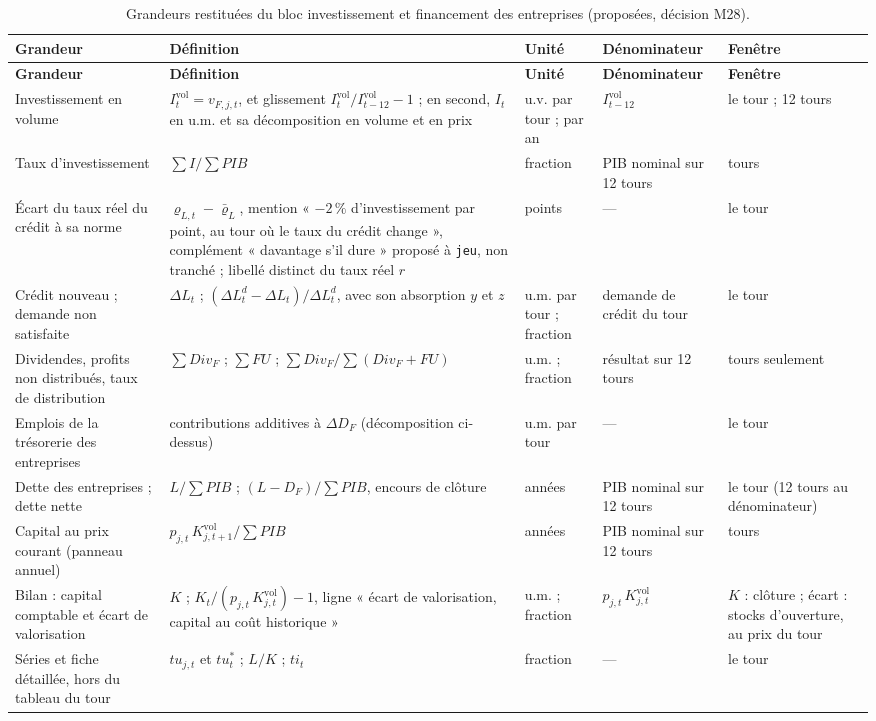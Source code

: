 \documentclass[11pt,a4paper]{article}
\begin{document}
\begin{center}\small
\setlength{\tabcolsep}{4pt}
\begin{longtable}{>{\raggedright\arraybackslash}p{2.5cm}>{\raggedright\arraybackslash}p{5.3cm}>{\raggedright\arraybackslash}p{1.7cm}>{\raggedright\arraybackslash}p{2.6cm}>{\raggedright\arraybackslash}p{2.3cm}}
\caption{Grandeurs restituées du bloc investissement et financement des entreprises (proposées, décision M28).}\label{tab:investissement-restitution}\\
\toprule
\textbf{Grandeur} & \textbf{Définition} & \textbf{Unité} & \textbf{Dénominateur} & \textbf{Fenêtre}\\
\midrule
\endfirsthead
\toprule
\textbf{Grandeur} & \textbf{Définition} & \textbf{Unité} & \textbf{Dénominateur} & \textbf{Fenêtre}\\
\midrule
\endhead
Investissement en volume & $I^{\mathrm{vol}}_t = v_{F,j,t}$, et glissement $I^{\mathrm{vol}}_t/I^{\mathrm{vol}}_{t-12} - 1$ ; en second, $I_t$ en u.m. et sa décomposition en volume et en prix & u.v. par tour ; par an & $I^{\mathrm{vol}}_{t-12}$ & le tour ; 12 tours\\
Taux d'investissement & $\sum I/\sum \mathit{PIB}$ & fraction & PIB nominal sur 12 tours & 12 tours\\
Écart du taux réel du crédit à sa norme & $\varrho_{L,t} - \bar\varrho_L$, mention « $-2\,\%$ d'investissement par point, au tour où le taux du crédit change », complément « davantage s'il dure » proposé à \texttt{jeu}, non tranché ; libellé distinct du taux réel $r$ & points & --- & le tour\\
Crédit nouveau ; demande non satisfaite & $\Delta L_t$ ; $(\Delta L^d_t - \Delta L_t)/\Delta L^d_t$, avec son absorption $y$ et $z$ & u.m. par tour ; fraction & demande de crédit du tour & le tour\\
Dividendes, profits non distribués, taux de distribution & $\sum \mathit{Div}_F$ ; $\sum \mathit{FU}$ ; $\sum \mathit{Div}_F/\sum(\mathit{Div}_F + \mathit{FU})$ & u.m. ; fraction & résultat sur 12 tours & 12 tours seulement\\
Emplois de la trésorerie des entreprises & contributions additives à $\Delta D_F$ (décomposition ci-dessus) & u.m. par tour & --- & le tour\\
Dette des entreprises ; dette nette & $L/\sum \mathit{PIB}$ ; $(L - D_F)/\sum \mathit{PIB}$, encours de clôture & années & PIB nominal sur 12 tours & le tour (12 tours au dénominateur)\\
Capital au prix courant (panneau annuel) & $p_{j,t}\,K^{\mathrm{vol}}_{j,t+1}/\sum \mathit{PIB}$ & années & PIB nominal sur 12 tours & 12 tours\\
Bilan : capital comptable et écart de valorisation & $K$ ; $K_t/(p_{j,t}\,K^{\mathrm{vol}}_{j,t}) - 1$, ligne « écart de valorisation, capital au coût historique » & u.m. ; fraction & $p_{j,t}\,K^{\mathrm{vol}}_{j,t}$ & $K$ : clôture ; écart : stocks d'ouverture, au prix du tour\\
Séries et fiche détaillée, hors du tableau du tour & $\mathit{tu}_{j,t}$ et $\mathit{tu}^\ast_t$ ; $L/K$ ; $\mathit{ti}_t$ & fraction & --- & le tour\\
\bottomrule
\end{longtable}
\end{center}
\end{document}
